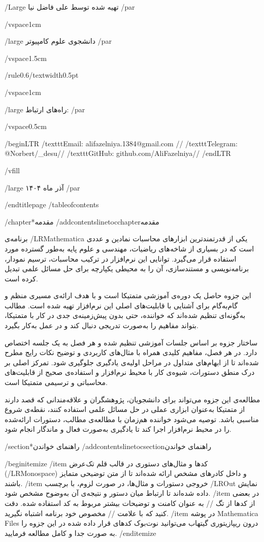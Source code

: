 {/Large
تهیه شده توسط علی فاضل نیا
/par}

/vspace{1cm}

{/large
دانشجوی علوم کامپیوتر
/par}

/vspace{1.5cm}

/rule{0.6/textwidth}{0.5pt}

/vspace{1cm}

{/large
راه‌های ارتباط:
/par}

/vspace{0.5cm}

/begin{LTR}
/texttt{Email: alifazelniya.1384@gmail.com} // 
/texttt{Telegram: @Norbert/_desu}// 
/texttt{GitHub: github.com/AliFazelniya}// 
/end{LTR}

/vfill

{/large
آذر ماه ۱۴۰۴
/par}

/end{titlepage}
/tableofcontents



/chapter*{مقدمه}
/addcontentsline{toc}{chapter}{مقدمه}

برنامه‌ی /LR{Mathematica} یکی از قدرتمندترین ابزارهای محاسبات نمادین و عددی است که در بسیاری از شاخه‌های ریاضیات، مهندسی و علوم پایه به‌طور گسترده مورد استفاده قرار می‌گیرد. توانایی این نرم‌افزار در ترکیب محاسبات، ترسیم نمودار، برنامه‌نویسی و مستندسازی، آن را به محیطی یکپارچه برای حل مسائل علمی تبدیل کرده است.

این جزوه حاصل یک دوره‌ی آموزشی متمتیکا است و با هدف ارائه‌ی مسیری منظم و گام‌به‌گام برای آشنایی با قابلیت‌های اصلی این نرم‌افزار تهیه شده است. مطالب به‌گونه‌ای تنظیم شده‌اند که خواننده، حتی بدون پیش‌زمینه‌ی جدی در کار با متمتیکا، بتواند مفاهیم را به‌صورت تدریجی دنبال کند و در عمل به‌کار بگیرد.

ساختار جزوه بر اساس جلسات آموزشی تنظیم شده و هر فصل به یک جلسه اختصاص دارد. در هر فصل، مفاهیم کلیدی همراه با مثال‌های کاربردی و توضیح نکات رایج مطرح شده‌اند تا از ابهام‌های متداول در مراحل اولیه‌ی یادگیری جلوگیری شود. تمرکز اصلی بر درک منطق دستورات، شیوه‌ی کار با محیط نرم‌افزار و استفاده‌ی صحیح از قابلیت‌های محاسباتی و ترسیمی متمتیکا است.

مطالعه‌ی این جزوه می‌تواند برای دانشجویان، پژوهشگران و علاقه‌مندانی که قصد دارند از متمتیکا به‌عنوان ابزاری عملی در حل مسائل علمی استفاده کنند، نقطه‌ی شروع مناسبی باشد. توصیه می‌شود خواننده هم‌زمان با مطالعه‌ی مطالب، دستورات ارائه‌شده را در محیط نرم‌افزار اجرا کند تا یادگیری به‌صورت فعال و ماندگار انجام شود.


/section*{راهنمای خواندن}
/addcontentsline{toc}{section}{راهنمای خواندن}

/begin{itemize}
/item کدها و مثال‌های دستوری در قالب قلم تک‌عرض (/LR{Monospace}) و داخل کادرهای مشخص ارائه شده‌اند تا از متن توضیحی متمایز باشند.
/item خروجی دستورات و مثال‌ها، در صورت لزوم، با برچسب /LR{Out} نمایش داده شده‌اند تا ارتباط میان دستور و نتیجه‌ی آن به‌وضوح مشخص شود.
/item در بعضی از کدها از تگ // به عنوان کامنت و توضیحات بیشتر مربوط به کد استفاده شده. دقت کنید که با علامت // مخصوص خود برنامه اشتباه نگیرید.
/item در پوشه Mathematica Files درون ریپازیتوری گیتهاب می‌توانید نوت‌بوک کد‌های قرار داده شده در این جزوه را به صورت جدا و کامل مطالعه فرمایید.
/end{itemize}


